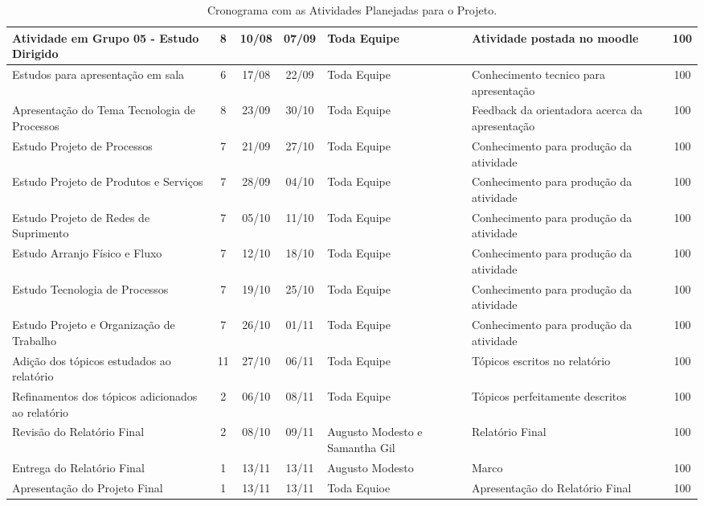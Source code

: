 \begin{landscape}
		\begin{table}[h]
			\centering
			\begin{tabular}{|p{7cm}|c|c|c|p{4cm}|p{4cm}|c|}
				\hline
				Atividade em Grupo 05 - Estudo Dirigido & 8 & 10/08 & 07/09 & Toda Equipe & Atividade postada no moodle & 100 \\ \hline
				Estudos para apresentação em sala & 6 & 17/08 & 22/09 & Toda Equipe & Conhecimento tecnico para apresentação & 100 \\ \hline
				Apresentação do Tema Tecnologia de Processos\footnotemark[1]& 8 & 23/09 & 30/10 & Toda Equipe & Feedback da orientadora acerca da apresentação & 100 \\ \hline
				Estudo Projeto de Processos & 7 & 21/09 & 27/10 & Toda Equipe & Conhecimento para produção da atividade & 100 \\ \hline
				Estudo Projeto de Produtos e Serviços & 7 & 28/09 & 04/10 & Toda Equipe & Conhecimento para produção da atividade & 100 \\ \hline
				Estudo Projeto de Redes de Suprimento & 7 & 05/10 & 11/10 & Toda Equipe & Conhecimento para produção da atividade & 100 \\ \hline
				Estudo Arranjo Físico e Fluxo & 7 & 12/10 & 18/10 & Toda Equipe & Conhecimento para produção da atividade & 100 \\ \hline
				Estudo Tecnologia de Processos & 7 & 19/10 & 25/10 & Toda Equipe & Conhecimento para produção da atividade & 100 \\ \hline
				Estudo Projeto e Organização de Trabalho & 7 & 26/10 & 01/11 & Toda Equipe & Conhecimento para produção da atividade & 100 \\ \hline
				Adição dos tópicos estudados ao relatório & 11 & 27/10 & 06/11 & Toda Equipe & Tópicos escritos no relatório & 100 \\ \hline
				Refinamentos dos tópicos adicionados ao relatório & 2 & 06/10 & 08/11 & Toda Equipe & Tópicos perfeitamente descritos & 100 \\ \hline
				Revisão do Relatório Final & 2 & 08/10 & 09/11 & Augusto Modesto e Samantha Gil & Relatório Final & 100 \\ \hline
				Entrega do Relatório Final & 1 & 13/11 & 13/11 & Augusto Modesto & Marco & 100 \\ \hline
				Apresentação do Projeto Final & 1 & 13/11 & 13/11 & Toda Equioe & Apresentação do Relatório Final & 100 \\ \hline
			\end{tabular}
			\caption[Cronograma com as Atividades Planejadas para o Projeto]{Cronograma com as Atividades Planejadas para o Projeto.}
			\label{tab:cronograma_.table}
		\end{table}

\end{landscape}
